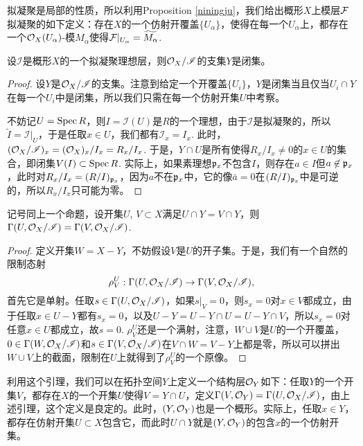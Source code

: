 拟凝聚是局部的性质，所以利用Proposition \ref{niningju}，我们给出概形$X$上模层$\mathcal{F}$拟凝聚的如下定义：存在$X$的一个仿射开覆盖$\{U_\alpha\}$，使得在每一个$U_\alpha$上，都存在一个$\mathcal{O}_X(U_\alpha)$-模$M_\alpha$使得$\mathcal{F}|_{U_\alpha}=\widetilde{M_\alpha}$.

\begin{pro}
设$\mathscr{I}$是概形$X$的一个拟凝聚理想层，则$\mathcal{O}_X/\mathscr{I}$的支集$Y$是闭集。
\end{pro}

\begin{proof}
设$Y$是$\mathcal{O}_X/\mathscr{I}$的支集。注意到给定一个开覆盖$\{U_i\}$，$Y$是闭集当且仅当$U_i\cap Y$在每一个$U_i$中是闭集，所以我们只需在每一个仿射开集$U$中考察。

不妨记$U=\operatorname{Spec} R$，则$I=\mathscr{I}(U)$是$R$的一个理想，由于$\mathscr{I}$是拟凝聚的，所以$\widetilde{I}=\mathscr{I}|_U$，于是任取$x\in U$，我们都有$\mathscr{I}_x=I_x$. 此时，$(\mathcal{O}_X/\mathscr{I})_x=(\mathcal{O}_X)_x/I_x=R_x/I_x$. 于是，$Y\cap U$是所有使得$R_x/I_x\neq 0$的$x\in U$的集合，即闭集$V(I)\subset \operatorname{Spec} R$. 实际上，如果素理想$\mathfrak{p}_x$不包含$I$，则存在$a\in I$但$a\not\in \mathfrak{p}_x$，此时对$R_x/I_x=(R/I)_{\mathfrak{p}_x}$，因为$a$不在$\mathfrak{p}_x$中，它的像$\bar{a}=0$在$(R/I)_{\mathfrak{p}_x}$中是可逆的，所以$R_x/I_x$只可能为零。
\end{proof}

\begin{lem}
记号同上一个命题，设开集$U$, $V\subset X$满足$U\cap Y=V\cap Y$，则$\Gamma(U,\mathcal{O}_X/\mathscr{I})=\Gamma(V,\mathcal{O}_X/\mathscr{I})$.
\end{lem}

\begin{proof}
定义开集$W=X-Y$，不妨假设$V$是$U$的开子集。于是，我们有一个自然的限制态射
\[
	\rho^U_V:\Gamma(U,\mathcal{O}_X/\mathscr{I})\to\Gamma(V,\mathcal{O}_X/\mathscr{I}),
\]
首先它是单射。任取$s\in \Gamma(U,\mathcal{O}_X/\mathscr{I})$，如果$s|_V=0$，则$s_x=0$对$x\in V$都成立，由于任取$x\in U-Y$都有$s_x=0$，以及$U-Y=U-Y\cap U=U-Y\cap V$，所以$s_x=0$对任意$x\in U$都成立，故$s=0$. $\rho^U_V$还是一个满射，注意，$W\cup V$是$U$的一个开覆盖，$0\in \Gamma(W,\mathcal{O}_X/\mathscr{I})$和$s\in \Gamma(V,\mathcal{O}_X/\mathscr{I})$在$V\cap W=V-Y$上都是零，所以可以拼出$W\cup V$上的截面，限制在$U$上就得到了$\rho^U_V$的一个原像。
\end{proof}

利用这个引理，我们可以在拓扑空间$Y$上定义一个结构层$\mathcal{O}_Y$如下：任取$Y$的一个开集$V$，都存在$X$的一个开集$U$使得$V=Y\cap U$，定义$\Gamma(V,\mathcal{O}_Y)=\Gamma(U,\mathcal{O}_X/\mathscr{I})$，由上述引理，这个定义是良定的。此时，$(Y,\mathcal{O}_Y)$也是一个概形。实际上，任取$x\in Y$，都存在仿射开集$U\subset X$包含它，而此时$U\cap Y$就是$(Y,\mathcal{O}_Y)$的包含$x$的一个仿射开集。

